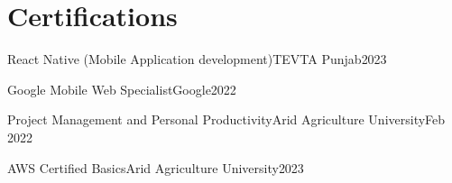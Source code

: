 


\section{Certifications}
\vspace{3pt}

\resumeSubHeadingListStart

\resumeCertificateHeading
{React Native (Mobile Application development)}{TEVTA Punjab}{2023}

\resumeCertificateHeading
{Google Mobile Web Specialist}{Google}{2022}

\resumeCertificateHeading
{Project Management and Personal Productivity}{Arid Agriculture University}{Feb 2022}


\resumeCertificateHeading
{AWS Certified Basics}{Arid Agriculture University}{2023}

\resumeSubHeadingListEnd


